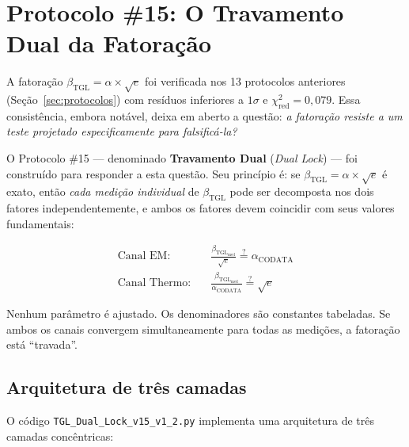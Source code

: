 \documentclass[12pt,a4paper,twoside]{article}
\newcommand{\betatgl}{\beta_{\!\scriptscriptstyle\mathrm{TGL}}}
\newcommand{\code}[1]{\texttt{#1}}
\begin{document}

\section{Protocolo \#15: O Travamento Dual da Fatoração}
\label{sec:protocolo15}

A fatoração $\betatgl = \alpha \times \sqrt{e}$ foi verificada nos 13 protocolos anteriores (Seção~\ref{sec:protocolos}) com resíduos inferiores a $1\sigma$ e $\chi^2_{\text{red}} = 0{,}079$. Essa consistência, embora notável, deixa em aberto a questão: \textit{a fatoração resiste a um teste projetado especificamente para falsificá-la?}

O Protocolo \#15 \cite{Miguel2026Protocol15} --- denominado \textbf{Travamento Dual} (\textit{Dual Lock}) --- foi construído para responder a esta questão. Seu princípio é: se $\betatgl = \alpha \times \sqrt{e}$ é exato, então \textit{cada medição individual} de $\betatgl$ pode ser decomposta nos dois fatores independentemente, e ambos os fatores devem coincidir com seus valores fundamentais:
%
\begin{equationbox}[title={O Travamento Dual}]
\begin{align}
\text{Canal EM:} \quad & \frac{\betatgl_{\text{med}}}{\sqrt{e}} \stackrel{?}{=} \alpha_{\text{CODATA}} \label{eq:canal_em} \\[6pt]
\text{Canal Thermo:} \quad & \frac{\betatgl_{\text{med}}}{\alpha_{\text{CODATA}}} \stackrel{?}{=} \sqrt{e} \label{eq:canal_thermo}
\end{align}
\end{equationbox}
%
Nenhum parâmetro é ajustado. Os denominadores são constantes tabeladas. Se ambos os canais convergem simultaneamente para todas as medições, a fatoração está ``travada''.


\subsection{Arquitetura de três camadas}

O código \code{TGL\_Dual\_Lock\_v15\_v1\_2.py} \cite{Miguel2026Protocol15} implementa uma arquitetura de três camadas concêntricas:
\end{document}
